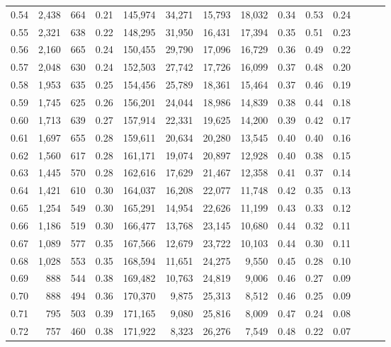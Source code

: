 \begin{tabular}{rrrrrrrrrrrrrr}
0.54 &  2,438 &  664 &  0.21 &  145,974 &   34,271 &  15,793 &  18,032 &  0.34 &  0.53 &      0.24 \\
0.55 &  2,321 &  638 &  0.22 &  148,295 &   31,950 &  16,431 &  17,394 &  0.35 &  0.51 &      0.23 \\
0.56 &  2,160 &  665 &  0.24 &  150,455 &   29,790 &  17,096 &  16,729 &  0.36 &  0.49 &      0.22 \\
0.57 &  2,048 &  630 &  0.24 &  152,503 &   27,742 &  17,726 &  16,099 &  0.37 &  0.48 &      0.20 \\
0.58 &  1,953 &  635 &  0.25 &  154,456 &   25,789 &  18,361 &  15,464 &  0.37 &  0.46 &      0.19 \\
0.59 &  1,745 &  625 &  0.26 &  156,201 &   24,044 &  18,986 &  14,839 &  0.38 &  0.44 &      0.18 \\
0.60 &  1,713 &  639 &  0.27 &  157,914 &   22,331 &  19,625 &  14,200 &  0.39 &  0.42 &      0.17 \\
0.61 &  1,697 &  655 &  0.28 &  159,611 &   20,634 &  20,280 &  13,545 &  0.40 &  0.40 &      0.16 \\
0.62 &  1,560 &  617 &  0.28 &  161,171 &   19,074 &  20,897 &  12,928 &  0.40 &  0.38 &      0.15 \\
0.63 &  1,445 &  570 &  0.28 &  162,616 &   17,629 &  21,467 &  12,358 &  0.41 &  0.37 &      0.14 \\
0.64 &  1,421 &  610 &  0.30 &  164,037 &   16,208 &  22,077 &  11,748 &  0.42 &  0.35 &      0.13 \\
0.65 &  1,254 &  549 &  0.30 &  165,291 &   14,954 &  22,626 &  11,199 &  0.43 &  0.33 &      0.12 \\
0.66 &  1,186 &  519 &  0.30 &  166,477 &   13,768 &  23,145 &  10,680 &  0.44 &  0.32 &      0.11 \\
0.67 &  1,089 &  577 &  0.35 &  167,566 &   12,679 &  23,722 &  10,103 &  0.44 &  0.30 &      0.11 \\
0.68 &  1,028 &  553 &  0.35 &  168,594 &   11,651 &  24,275 &   9,550 &  0.45 &  0.28 &      0.10 \\
0.69 &    888 &  544 &  0.38 &  169,482 &   10,763 &  24,819 &   9,006 &  0.46 &  0.27 &      0.09 \\
0.70 &    888 &  494 &  0.36 &  170,370 &    9,875 &  25,313 &   8,512 &  0.46 &  0.25 &      0.09 \\
0.71 &    795 &  503 &  0.39 &  171,165 &    9,080 &  25,816 &   8,009 &  0.47 &  0.24 &      0.08 \\
0.72 &    757 &  460 &  0.38 &  171,922 &    8,323 &  26,276 &   7,549 &  0.48 &  0.22 &      0.07 \\

\end{tabular}
